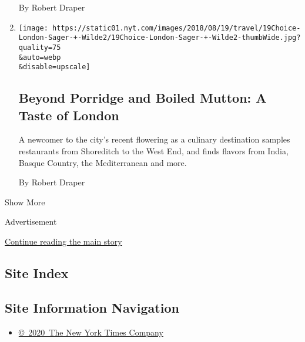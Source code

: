 \begin{enumerate}
  By Robert Draper
\item
  \href{/2018/08/15/travel/dining-in-london.html}{}

  \texttt{[image: https://static01.nyt.com/images/2018/08/19/travel/19Choice-London-Sager-+-Wilde2/19Choice-London-Sager-+-Wilde2-thumbWide.jpg?quality=75\\\&auto=webp\\\&disable=upscale]}

  \hypertarget{beyond-porridge-and-boiled-mutton-a-taste-of-london}{%
  \subsection{Beyond Porridge and Boiled Mutton: A Taste of
  London}\label{beyond-porridge-and-boiled-mutton-a-taste-of-london}}

  A newcomer to the city's recent flowering as a culinary destination
  samples restaurants from Shoreditch to the West End, and finds flavors
  from India, Basque Country, the Mediterranean and more.

  By Robert Draper
\end{enumerate}

Show More

Advertisement

\protect\hyperlink{after-mid2}{Continue reading the main story}

\hypertarget{site-index}{%
\subsection{Site Index}\label{site-index}}

\hypertarget{site-information-navigation}{%
\subsection{Site Information
Navigation}\label{site-information-navigation}}

\begin{itemize}
\tightlist
\item
  \href{https://help.nytimes.com/hc/en-us/articles/115014792127-Copyright-notice}{©~2020~The
  New York Times Company}
\end{itemize}

